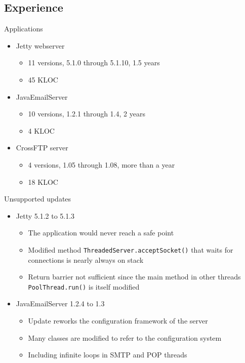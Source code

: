 
\subsection{Experience}
\ShowTOC

\newcommand{\HighlightRow}{\rowcolor{structure.fg!30}}

\begin{frame}{Applications}%
\begin{itemize}
\item Jetty webserver
  \begin{itemize}
  \item 11 versions, 5.1.0 through 5.1.10, 1.5 years
  \item 45 KLOC
  \end{itemize}
\item JavaEmailServer
  \begin{itemize}
  \item 10 versions, 1.2.1 through 1.4, 2 years
  \item 4 KLOC
  \end{itemize}
\item CrossFTP server
  \begin{itemize}
  \item 4 versions, 1.05 through 1.08, more than a year
  \item 18 KLOC
  \end{itemize}
\end{itemize}
\end{frame}

\begin{frame}{Unsupported updates}%
\begin{itemize}
\item Jetty 5.1.2 to 5.1.3
  \begin{itemize}
  \item The application would never reach a safe point
  \item Modified method {\tt ThreadedServer.acceptSocket()} that waits for
        connections is nearly always on stack
  \item Return barrier not sufficient since the main method in other
        threads {\tt PoolThread.run()} is itself modified
  \end{itemize}
\item JavaEmailServer 1.2.4 to 1.3
  \begin{itemize}
  \item Update reworks the configuration framework of the server
  \item Many classes are modified to refer to the configuration system
  \item Including infinite loops in SMTP and POP threads
  \end{itemize}
\end{itemize}
\end{frame}

